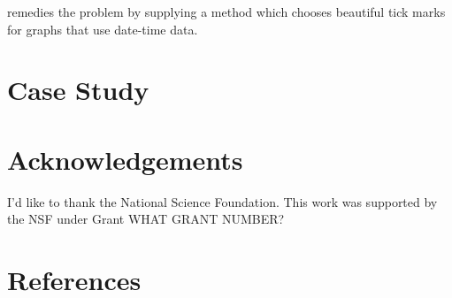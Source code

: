 \documentclass[article]{jss}
\begin{document}
 remedies the problem by supplying a  method which chooses beautiful tick marks for graphs that use date-time data. 




\section{Case Study}

\section*{Acknowledgements}
I'd like to thank the National Science Foundation. This work was supported by the NSF under Grant WHAT GRANT NUMBER? 

\section*{References}
\end{document}
